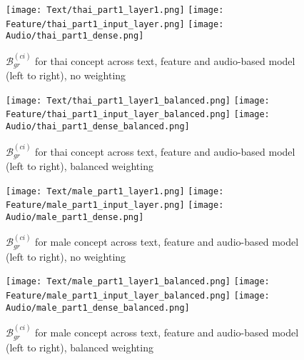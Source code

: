 \begin{figure}[H]
    \centering
    \begin{minipage}[t]{0.48\textwidth}
        \centering
        \texttt{[image: Text/thai\_part1\_layer1.png]}
        \hfill
        \texttt{[image: Feature/thai\_part1\_input\_layer.png]}
        \texttt{[image: Audio/thai\_part1\_dense.png]}
        \caption{$\mathcal{B}^{(ci)}_{gr}$ for thai concept across text, feature and audio-based model (left to right), no weighting}
        \label{fig:grad_thai}
    \end{minipage}
    \hfill
    \begin{minipage}[t]{0.48\textwidth}
        \centering
        \texttt{[image: Text/thai\_part1\_layer1\_balanced.png]}
        \hfill
        \texttt{[image: Feature/thai\_part1\_input\_layer\_balanced.png]}
        \texttt{[image: Audio/thai\_part1\_dense\_balanced.png]}
        \caption{$\mathcal{B}^{(ci)}_{gr}$ for thai concept across text, feature and audio-based model (left to right), balanced weighting}
        \label{fig:grad_thai_balanced}
    \end{minipage}
\end{figure}

\begin{figure}[H]
    \centering
    \begin{minipage}[t]{0.48\textwidth}
        \centering
        \texttt{[image: Text/male\_part1\_layer1.png]}
        \hfill
        \texttt{[image: Feature/male\_part1\_input\_layer.png]}
        \texttt{[image: Audio/male\_part1\_dense.png]}
        \caption{$\mathcal{B}^{(ci)}_{gr}$ for male concept across text, feature and audio-based model (left to right), no weighting}
        \label{fig:grad_male}
    \end{minipage}
    \hfill
    \begin{minipage}[t]{0.48\textwidth}
        \centering
        \texttt{[image: Text/male\_part1\_layer1\_balanced.png]}
        \hfill
        \texttt{[image: Feature/male\_part1\_input\_layer\_balanced.png]}
        \texttt{[image: Audio/male\_part1\_dense\_balanced.png]}
        \caption{$\mathcal{B}^{(ci)}_{gr}$ for male concept across text, feature and audio-based model (left to right), balanced weighting}
        \label{fig:grad_male_balanced}
    \end{minipage}
\end{figure}

